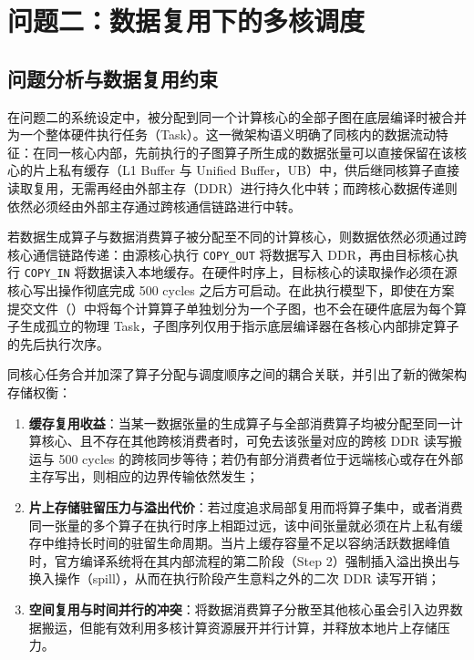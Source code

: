 \documentclass[anonymous,withtoc]{gmcm2026}
\providecommand{\tightlist}{\setlength{\itemsep}{0pt}\setlength{\parskip}{0pt}}
\begin{document}
\section{问题二：数据复用下的多核调度}

\subsection{问题分析与数据复用约束}

在问题二的系统设定中，被分配到同一个计算核心的全部子图在底层编译时被合并为一个整体硬件执行任务（Task）。这一微架构语义明确了同核内的数据流动特征：在同一核心内部，先前执行的子图算子所生成的数据张量可以直接保留在该核心的片上私有缓存（L1 Buffer 与 Unified Buffer，UB）中，供后继同核算子直接读取复用，无需再经由外部主存（DDR）进行持久化中转；而跨核心数据传递则依然必须经由外部主存通过跨核通信链路进行中转。

若数据生成算子与数据消费算子被分配至不同的计算核心，则数据依然必须通过跨核心通信链路传递：由源核心执行 \texttt{COPY\_OUT} 将数据写入 DDR，再由目标核心执行 \texttt{COPY\_IN} 将数据读入本地缓存。在硬件时序上，目标核心的读取操作必须在源核心写出操作彻底完成 500 cycles 之后方可启动。在此执行模型下，即使在方案提交文件（\texttt{}）中将每个计算算子单独划分为一个子图，也不会在硬件底层为每个算子生成孤立的物理 Task，子图序列仅用于指示底层编译器在各核心内部排定算子的先后执行次序。

同核心任务合并加深了算子分配与调度顺序之间的耦合关联，并引出了新的微架构存储权衡：

\begin{enumerate}
\def\labelenumi{\arabic{enumi}.}
\tightlist
\item
  \textbf{缓存复用收益}：当某一数据张量的生成算子与全部消费算子均被分配至同一计算核心、且不存在其他跨核消费者时，可免去该张量对应的跨核 DDR 读写搬运与 500 cycles 的跨核同步等待；若仍有部分消费者位于远端核心或存在外部主存写出，则相应的边界传输依然发生；
\item
  \textbf{片上存储驻留压力与溢出代价}：若过度追求局部复用而将算子集中，或者消费同一张量的多个算子在执行时序上相距过远，该中间张量就必须在片上私有缓存中维持长时间的驻留生命周期。当片上缓存容量不足以容纳活跃数据峰值时，官方编译系统将在其内部流程的第二阶段（Step 2）强制插入溢出换出与换入操作（spill），从而在执行阶段产生意料之外的二次 DDR 读写开销；
\item
  \textbf{空间复用与时间并行的冲突}：将数据消费算子分散至其他核心虽会引入边界数据搬运，但能有效利用多核计算资源展开并行计算，并释放本地片上存储压力。
\end{enumerate}
\end{document}
